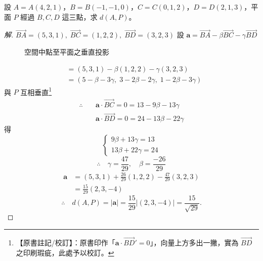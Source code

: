 \begin{example}[例 3]
設 $A = A(4, 2, 1)$，$B = B(-1, -1, 0)$，$C = C(0, 1, 2)$，$D = D(2, 1, 3)$，平面 $P$ 經過 $B, C, D$ 這三點，求 $d(A, P)$。
\end{example}
\begin{proof}[解]
$\vec{BA} = (5, 3, 1),\; \vec{BC} = (1, 2, 2),\; \vec{BD} = (3, 2, 3)$
設 $\mathbf{a} = \vec{BA} - \beta \vec{BC} - \gamma \vec{BD}$

\begin{figure}[H]
\centering
{}
\caption{空間中點至平面之垂直投影}
\label{fig:5-10}
\end{figure}

\begin{align*}
&= (5, 3, 1) - \beta(1, 2, 2) - \gamma(3, 2, 3) \\
&= (5 - \beta - 3\gamma,\; 3 - 2\beta - 2\gamma,\; 1 - 2\beta - 3\gamma)
\end{align*}
與 $P$ 互相垂直\label{note:b3s-ch5-p236-bd-prime}\footnote{【原書註記/校訂】：原書印作「$\mathbf{a} \cdot \vec{BD}' = 0$」，向量上方多出一撇，實為 $\vec{BD}$ 之印刷瑕疵，此處予以校訂。}
\begin{align*}
\therefore\quad &\mathbf{a} \cdot \vec{BC} = 0 = 13 - 9\beta - 13\gamma \\
&\mathbf{a} \cdot \vec{BD} = 0 = 24 - 13\beta - 22\gamma
\end{align*}
得
\[ \begin{cases} 9\beta + 13\gamma = 13 \\ 13\beta + 22\gamma = 24 \end{cases} \]
\[ \therefore\quad \gamma = \frac{47}{29},\quad \beta = \frac{-26}{29} \]
\begin{align*}
\mathbf{a} &= (5, 3, 1) + \frac{26}{29}(1, 2, 2) - \frac{47}{29}(3, 2, 3) \\
&= \frac{15}{29}(2, 3, -4)
\end{align*}
\[ \therefore\quad d(A, P) = |\mathbf{a}| = \frac{15}{29} |(2, 3, -4)| = \frac{15}{\sqrt{29}}. \]
\end{proof}

